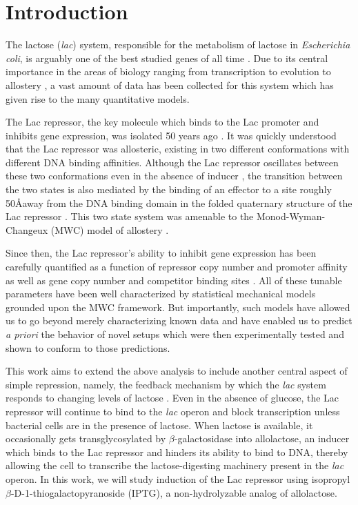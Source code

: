 \section*{Introduction }

The lactose (\textit{lac}) system, responsible for the metabolism of lactose in
\textit{Escherichia coli}, is arguably one of the best studied genes of all time
\cite{MullerHill1996a}. Due to its central importance in the areas of biology
ranging from transcription to evolution to allostery \cite{Razo-Mejia2014}
, a vast amount of data has been collected for this
system which has given rise to the many quantitative models.

The Lac repressor, the key molecule which binds to the Lac promoter and inhibits
gene expression, was isolated 50 years ago \cite{Gilbert1966}. It was quickly
understood that the Lac repressor was allosteric, existing in two different
conformations with different DNA binding affinities. Although the Lac repressor
oscillates between these two conformations even in the absence of inducer
, the transition between the two states is also mediated by the
binding of an effector to a site roughly 50\AA away from the DNA binding domain
in the folded quaternary structure of the Lac repressor \cite{Lewis1996}. This
two state system was amenable to the Monod-Wyman-Changeux (MWC) model of
allostery \cite{MONOD1965}.

Since then, the Lac repressor's ability to inhibit gene expression has been carefully quantified
as a function of repressor copy number and promoter affinity \cite{Garcia2011}
as well as gene copy number and competitor binding sites \cite{Weinert2014}. All
of these tunable parameters have been well characterized by statistical
mechanical models grounded upon the MWC framework. But importantly, such models
have allowed us to go beyond merely characterizing known data and have enabled
us to predict \textit{a priori} the behavior of novel setups which were then
experimentally tested and shown to conform to those predictions.

This work aims to extend the above analysis to include another central aspect of
simple repression, namely, the feedback mechanism by which the \textit{lac}
system responds to changing levels of lactose \cite{JACOB1961}. Even in the
absence of glucose, the Lac repressor will continue to bind to the \textit{lac}
operon and block transcription unless bacterial cells are in the presence of
lactose. When lactose is available, it occasionally gets transglycosylated by
$\beta$-galactosidase into allolactose, an inducer which binds to the Lac
repressor and hinders its ability to bind to DNA, thereby allowing the cell to
transcribe the lactose-digesting machinery present in the \textit{lac} operon.
In this work, we will study induction of the Lac repressor using isopropyl
$\beta$-D-1-thiogalactopyranoside (IPTG), a non-hydrolyzable analog of
allolactose.


